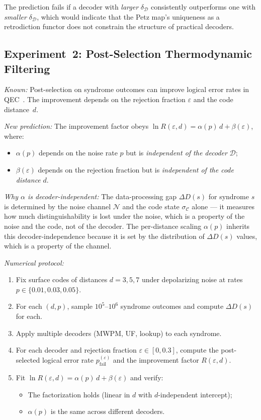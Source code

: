 \documentclass[prl,twocolumn,superscriptaddress,longbibliography]{revtex4-2}
\newcommand{\chan}{\mathcal{N}}
\newcommand{\code}{\mathcal{C}}
\begin{document}
The prediction fails if a decoder with
\emph{larger} $\delta_{\mathcal{D}}$ consistently outperforms one
with \emph{smaller} $\delta_{\mathcal{D}}$, which would indicate that
the Petz map's uniqueness as a retrodiction functor does not
constrain the structure of practical decoders.

\subsection{Experiment~2: Post-Selection Thermodynamic Filtering}

\emph{Known:} Post-selection on syndrome outcomes can improve
logical error rates in QEC~\cite{SmithBrownBartlett2024,ChenEtAl2025}.
The improvement depends on the rejection fraction $\varepsilon$ and
the code distance~$d$.

\emph{New prediction:} The improvement factor obeys
$\ln R(\varepsilon, d) = \alpha(p)\, d + \beta(\varepsilon)$,
where:
\begin{itemize}
\item $\alpha(p)$ depends on the noise rate $p$ but is
  \emph{independent of the decoder} $\mathcal{D}$;
\item $\beta(\varepsilon)$ depends on the rejection fraction but is
  \emph{independent of the code distance} $d$.
\end{itemize}

\emph{Why $\alpha$ is decoder-independent:} The data-processing gap
$\Delta D(s)$ for syndrome $s$ is determined by the noise channel
$\chan$ and the code state $\sigma_\code$ alone --- it measures how
much distinguishability is lost under the noise, which is a property
of the noise and the code, not of the decoder. The per-distance
scaling $\alpha(p)$ inherits this decoder-independence because it is
set by the distribution of $\Delta D(s)$ values, which is a property
of the channel.

\emph{Numerical protocol:}
\begin{enumerate}
\item Fix surface codes of distances $d = 3, 5, 7$ under
  depolarizing noise at rates $p \in \{0.01, 0.03, 0.05\}$.
\item For each $(d, p)$, sample $10^5$--$10^6$ syndrome outcomes and
  compute $\Delta D(s)$ for each.
\item Apply multiple decoders (MWPM, UF, lookup) to each syndrome.
\item For each decoder and rejection fraction $\varepsilon \in
  [0, 0.3]$, compute the post-selected logical error rate
  $p_{\mathrm{fail}}^{(\varepsilon)}$ and the improvement factor
  $R(\varepsilon, d)$.
\item Fit $\ln R(\varepsilon, d) = \alpha(p)\, d +
  \beta(\varepsilon)$ and verify:
  \begin{itemize}
  \item[(a)] The factorization holds (linear in $d$ with
    $d$-independent intercept);
  \item[(b)] $\alpha(p)$ is the same across different decoders.
  \end{itemize}
\end{enumerate}
\end{document}
